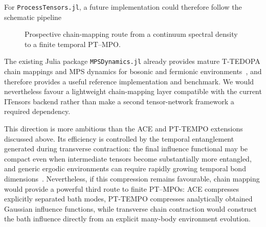 For \texttt{ProcessTensors.jl}, a future implementation could therefore follow the schematic pipeline
%
\begin{figure}[H]
    \centering
    \caption{Prospective chain-mapping route from a continuum spectral density to a finite temporal PT--MPO.}
    \label{fig:roadmap-chainmapping-pipeline}
\end{figure}
%
The existing Julia package \texttt{MPSDynamics.jl} already provides mature T-TEDOPA chain mappings and MPS dynamics for bosonic and fermionic environments~\cite{lacroix2024mpsdynamics}, and therefore provides a useful reference implementation and benchmark.
We would nevertheless favour a lightweight chain-mapping layer compatible with the current ITensors backend rather than make a second tensor-network framework a required dependency.

This direction is more ambitious than the ACE and PT-TEMPO extensions discussed above.
Its efficiency is controlled by the temporal entanglement generated during transverse contraction: the final influence functional may be compact even when intermediate tensors become substantially more entangled, and generic ergodic environments can require rapidly growing temporal bond dimensions~\cite{ye2021influence,cerezo2025spatiotemporal}.
Nevertheless, if this compression remains favourable, chain mapping would provide a powerful third route to finite PT--MPOs: ACE compresses explicitly separated bath modes, PT-TEMPO compresses analytically obtained Gaussian influence functions, while transverse chain contraction would construct the bath influence directly from an explicit many-body environment evolution.

